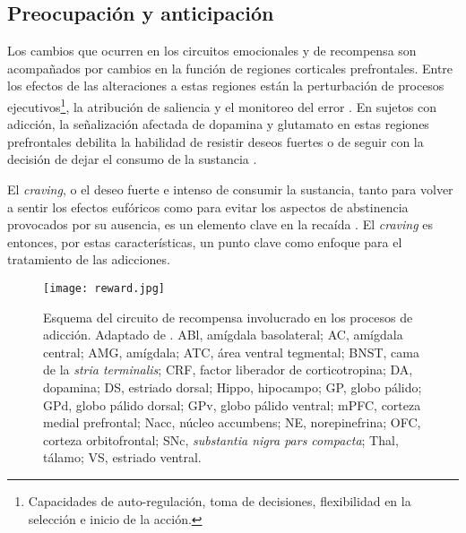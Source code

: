 \subsection{Preocupación y anticipación}
\label{crav}
Los cambios que ocurren en los circuitos emocionales y de recompensa son acompañados por cambios en la función de regiones corticales prefrontales.
Entre los efectos de las alteraciones a estas regiones están la perturbación de procesos ejecutivos\footnote{Capacidades de auto-regulación, toma de decisiones, flexibilidad en la selección e inicio de la acción.}, la atribución de saliencia y el monitoreo del error \parencite{Goldstein2012a,Volkow2016}.
En sujetos con adicción, la señalización afectada de dopamina y glutamato en estas regiones prefrontales debilita la habilidad de resistir deseos fuertes o de seguir con la decisión de dejar el consumo de la sustancia \parencite{Volkow2016}.\par
El \textit{craving}, o el deseo fuerte e intenso de consumir la sustancia, tanto para volver a sentir los efectos eufóricos como para evitar los aspectos de abstinencia provocados por su ausencia, es un elemento clave en la recaída \parencite{Koob2010a}.
El \textit{craving} es entonces, por estas características, un punto clave como enfoque para el tratamiento de las adicciones.

\begin{figure}[!ht]
    \centering
    \texttt{[image: reward.jpg]}
    \caption{Esquema del circuito de recompensa involucrado en los procesos de adicción. Adaptado de \textcite{Koob2010a}. ABl, amígdala basolateral; AC, amígdala central; AMG, amígdala; ATC, área ventral tegmental; BNST, cama de la \textit{stria terminalis}; CRF, factor liberador de corticotropina; DA, dopamina; DS, estriado dorsal; Hippo, hipocampo; GP, globo pálido; GPd, globo pálido dorsal; GPv, globo pálido ventral; mPFC, corteza medial prefrontal; Nacc, núcleo accumbens; NE, norepinefrina; OFC, corteza orbitofrontal; SNc, \textit{substantia nigra pars compacta}; Thal, tálamo; VS, estriado ventral.}
    \label{fig:rew}
\end{figure}

